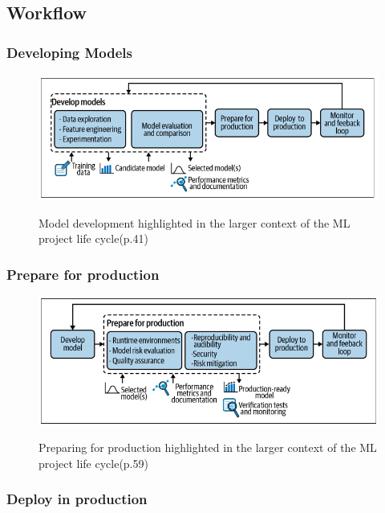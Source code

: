 \subsection{Workflow}\label{subsec:workflow}


\subsubsection{Developing Models}

\begin{figure}[!htbp]
    \caption{Model development highlighted in the larger context of the ML project life
    cycle\cite{treveil2020introducing}(p.41)}
    \centering
    \includegraphics[scale=0.5]{images/developing-models-intro}
    \label{fig:developing-models-intro}
\end{figure}


\subsubsection{Prepare for production}

\begin{figure}[!htbp]
    \caption{Preparing for production highlighted in the larger context of the ML project
    life cycle\cite{treveil2020introducing}(p.59)}
    \centering
    \includegraphics[scale=0.5]{images/prep-prod-intro}
    \label{fig:prep-prod-intro}
\end{figure}


\subsubsection{Deploy in production}


